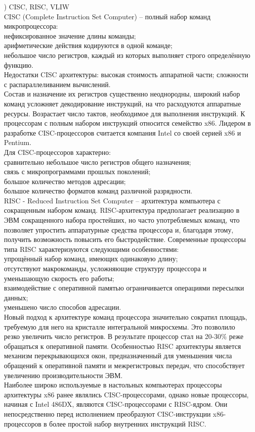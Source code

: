 ) CISC, RISC, VLIW \\
CISC (Complete Instruction Set Computer) – полный набор команд микропроцессора: \\
нефиксированное значение длины команды; \\
арифметические действия кодируются в одной команде; \\
небольшое число регистров, каждый из которых выполняет строго определённую функцию. \\
Недостатки CISC архитектуры:
высокая стоимость аппаратной части; сложности с распараллеливанием вычислений. \\
Состав и назначение их регистров существенно неоднородны, широкий набор команд усложняет декодирование инструкций, на что расходуются аппаратные ресурсы. Возрастает число тактов, необходимое для выполнения инструкций. К процессорам с полным набором инструкций относится семейство x86. Лидером в разработке CISC-процессоров считается компания Intel со своей серией x86 и Pentium. \\
Для CISC-процессоров характерно: \\
сравнительно небольшое число регистров общего назначения; \\
связь с микропрограммами прошлых поколений; \\
большое количество методов адресации; \\
большое количество форматов команд различной разрядности. \\

\noindent RISC - Reduced Instruction Set Computer – архитектура компьютера с сокращенным набором команд. RISC-архитектура предполагает реализацию в ЭВМ сокращенного набора простейших, но часто употребляемых команд, что позволяет упростить аппаратурные средства процессора и, благодаря этому, получить возможность повысить его быстродействие. Современные процессоры типа RISC характеризуются следующими особенностями: \\
упрощённый набор команд, имеющих одинаковую длину; \\
отсутствуют макрокоманды, усложняющие структуру процессора и уменьшающую скорость его работы; \\
взаимодействие с оперативной памятью ограничивается операциями пересылки данных; \\
уменьшено число способов адресации. \\
Новый подход к архитектуре команд процессора значительно сократил площадь, требуемую для него на кристалле интегральной микросхемы. Это позволило резко увеличить число регистров. В результате процессор стал на 20-30\% реже обращаться к оперативной памяти. Особенностью RISC архитектуры является механизм перекрывающихся окон, предназначенный для уменьшения числа обращений к оперативной памяти и межрегистровых передач, что способствует увеличению производительности ЭВМ. \\
Наиболее широко используемые в настольных компьютерах процессоры архитектуры x86 ранее являлись CISC-процессорами, однако новые процессоры, начиная с Intel 486DX, являются CISC-процессорами с RISC-ядром. Они непосредственно перед исполнением преобразуют CISC-инструкции x86-процессоров в более простой набор внутренних инструкций RISC. \\

